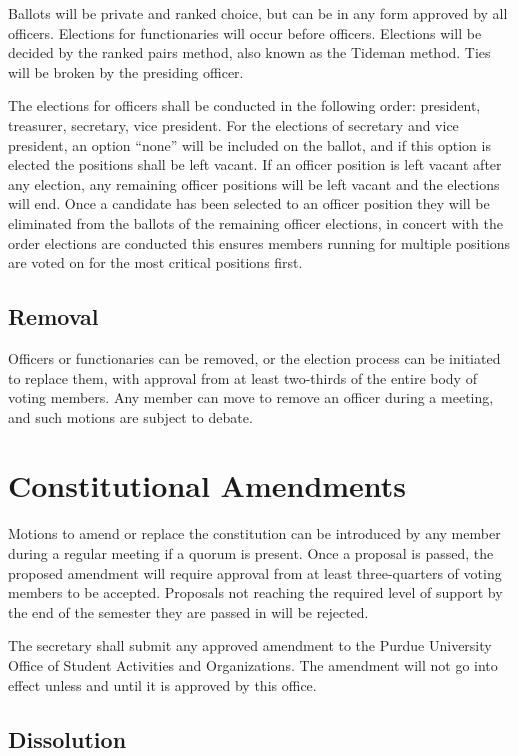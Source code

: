 \documentclass{article}
\begin{document}
Ballots will be private and ranked choice, but can be in any form approved by
all officers. Elections for functionaries will occur before officers. Elections
will be decided by the ranked pairs method, also known as the Tideman method.
Ties will be broken by the presiding officer.

The elections for officers shall be conducted in the following order: president,
treasurer, secretary, vice president. For the elections of secretary and vice
president, an option ``none'' will be included on the ballot, and if this option
is elected the positions shall be left vacant. If an officer position is left
vacant after any election, any remaining officer positions will be left vacant
and the elections will end. Once a candidate has been selected to an officer
position they will be eliminated from the ballots of the remaining officer
elections, in concert with the order elections are conducted this ensures
members running for multiple positions are voted on for the most critical
positions first.

\subsection{Removal}

Officers or functionaries can be removed, or the election process can be
initiated to replace them, with approval from at least two-thirds of the entire
body of voting members. Any member can move to remove an officer during a
meeting, and such motions are subject to debate.

\section{Constitutional Amendments}

Motions to amend or replace the constitution can be introduced by any member
during a regular meeting if a quorum is present. Once a proposal is passed, the
proposed amendment will require approval from at least three-quarters of voting
members to be accepted. Proposals not reaching the required level of support by
the end of the semester they are passed in will be rejected.

The secretary shall submit any approved amendment to the Purdue University
Office of Student Activities and Organizations. The amendment will not go into
effect unless and until it is approved by this office.

\subsection{Dissolution}
\end{document}
